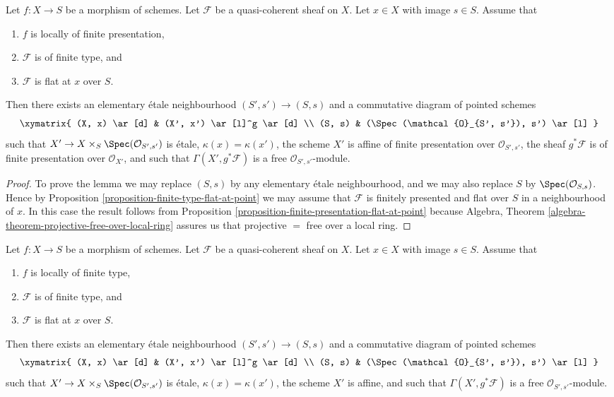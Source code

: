\begin{lemma}
\label{lemma-finite-type-flat-at-point-free}
Let $f : X \to S$ be a morphism of schemes.
Let $\mathcal{F}$ be a quasi-coherent sheaf on $X$.
Let $x \in X$ with image $s \in S$.
Assume that
\begin{enumerate}
\item $f$ is locally of finite presentation,
\item $\mathcal{F}$ is of finite type, and
\item $\mathcal{F}$ is flat at $x$ over $S$.
\end{enumerate}
Then there exists an elementary \'etale neighbourhood $(S', s') \to (S, s)$
and a commutative diagram of pointed schemes
$$
\xymatrix{
(X, x) \ar[d] & (X', x') \ar[l]^g \ar[d] \\
(S, s) & (\Spec(\mathcal{O}_{S', s'}), s') \ar[l]
}
$$
such that $X' \to X \times_S \Spec(\mathcal{O}_{S', s'})$
is \'etale, $\kappa(x) = \kappa(x')$, the scheme $X'$ is
affine of finite presentation over $\mathcal{O}_{S', s'}$,
the sheaf $g^*\mathcal{F}$ is of finite presentation over $\mathcal{O}_{X'}$,
and such that $\Gamma(X', g^*\mathcal{F})$ is a free
$\mathcal{O}_{S', s'}$-module.
\end{lemma}

\begin{proof}
To prove the lemma we may replace $(S, s)$ by any elementary \'etale
neighbourhood, and we may also replace $S$ by
$\Spec(\mathcal{O}_{S, s})$. Hence by
Proposition \ref{proposition-finite-type-flat-at-point}
we may assume that $\mathcal{F}$ is finitely presented and flat over
$S$ in a neighbourhood of $x$. In this case the result follows from
Proposition \ref{proposition-finite-presentation-flat-at-point}
because
Algebra, Theorem \ref{algebra-theorem-projective-free-over-local-ring}
assures us that projective $=$ free over a local ring.
\end{proof}

\begin{lemma}
\label{lemma-finite-type-flat-at-point-free-variant}
Let $f : X \to S$ be a morphism of schemes.
Let $\mathcal{F}$ be a quasi-coherent sheaf on $X$.
Let $x \in X$ with image $s \in S$.
Assume that
\begin{enumerate}
\item $f$ is locally of finite type,
\item $\mathcal{F}$ is of finite type, and
\item $\mathcal{F}$ is flat at $x$ over $S$.
\end{enumerate}
Then there exists an elementary \'etale neighbourhood $(S', s') \to (S, s)$
and a commutative diagram of pointed schemes
$$
\xymatrix{
(X, x) \ar[d] & (X', x') \ar[l]^g \ar[d] \\
(S, s) & (\Spec(\mathcal{O}_{S', s'}), s') \ar[l]
}
$$
such that $X' \to X \times_S \Spec(\mathcal{O}_{S', s'})$
is \'etale, $\kappa(x) = \kappa(x')$, the scheme $X'$ is
affine, and such that $\Gamma(X', g^*\mathcal{F})$ is a free
$\mathcal{O}_{S', s'}$-module.
\end{lemma}

